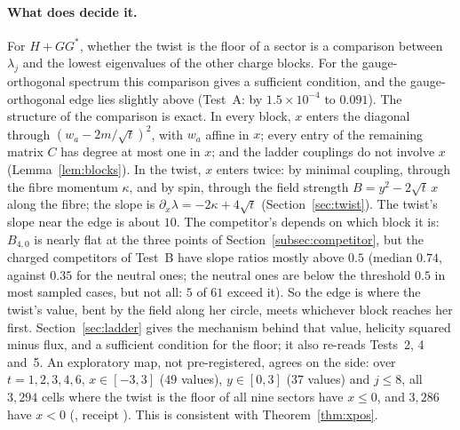 \documentclass[11pt]{article}
\theoremstyle{definition}
\theoremstyle{remark}
\begin{document}
\paragraph{What does decide it.} For $H+GG^*$, whether the twist is the floor of a sector is a comparison between
$\lambda_j$ and the lowest eigenvalues of the other charge blocks. For the gauge-orthogonal spectrum this comparison
gives a sufficient condition, and the gauge-orthogonal edge lies slightly above (Test~A: by $1.5\times10^{-4}$ to
$0.091$). The structure of the comparison is exact. In every block, $x$ enters the diagonal through
$(w_a-2m/\sqrt t)^2$, with $w_a$ affine in $x$; every entry of the remaining matrix $C$ has degree at most one in $x$; and
the ladder couplings do not involve $x$ (Lemma~\ref{lem:blocks}). In the twist, $x$ enters twice: by minimal coupling,
through the fibre momentum $\kappa$, and by spin, through the field strength $B=y^2-2\sqrt t\,x$ along the fibre; the
slope is $\partial_x\lambda=-2\kappa+4\sqrt t$ (Section~\ref{sec:twist}). The twist's slope near the edge is about $10$.
The competitor's depends on which block it is: $B_{4,0}$ is nearly flat at the three points of
Section~\ref{subsec:competitor}, but the charged competitors of Test~B have slope ratios mostly above $0.5$ (median
$0.74$, against $0.35$ for the neutral ones; the neutral ones are below the threshold $0.5$ in most sampled cases, but
not all: $5$ of $61$ exceed it). So the edge is where the twist's value, bent by the field along her circle,
meets whichever block reaches her first. Section~\ref{sec:ladder} gives the mechanism behind that value, helicity
squared minus flux, and a sufficient condition for the floor; it also re-reads Tests~2, 4 and~5. An exploratory map, not pre-registered, agrees on the side: over
$t=1,2,3,4,6$, $x\in[-3,3]$ ($49$ values), $y\in[0,3]$ ($37$ values) and $j\le8$, all $3{,}294$ cells where the twist is
the floor of all nine sectors have $x\le0$, and $3{,}286$ have $x<0$ (,
receipt ). This is consistent with Theorem~\ref{thm:xpos}.
\end{document}
